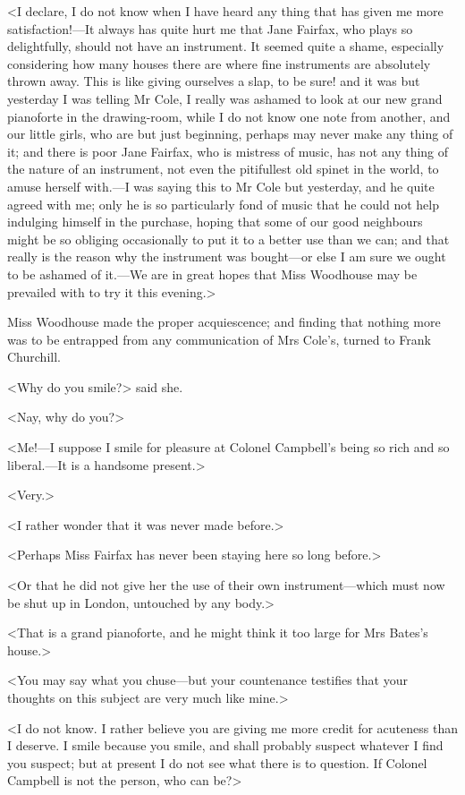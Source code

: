 <I declare, I do not know when I have heard any thing that has given me more satisfaction!—It always has quite hurt me that Jane Fairfax, who plays so delightfully, should not have an instrument. It seemed quite a shame, especially considering how many houses there are where fine instruments are absolutely thrown away. This is like giving ourselves a slap, to be sure! and it was but yesterday I was telling Mr Cole, I really was ashamed to look at our new grand pianoforte in the drawing-room, while I do not know one note from another, and our little girls, who are but just beginning, perhaps may never make any thing of it; and there is poor Jane Fairfax, who is mistress of music, has not any thing of the nature of an instrument, not even the pitifullest old spinet in the world, to amuse herself with.—I was saying this to Mr Cole but yesterday, and he quite agreed with me; only he is so particularly fond of music that he could not help indulging himself in the purchase, hoping that some of our good neighbours might be so obliging occasionally to put it to a better use than we can; and that really is the reason why the instrument was bought—or else I am sure we ought to be ashamed of it.—We are in great hopes that Miss Woodhouse may be prevailed with to try it this evening.>

Miss Woodhouse made the proper acquiescence; and finding that nothing more was to be entrapped from any communication of Mrs Cole's, turned to Frank Churchill.

<Why do you smile?> said she.

<Nay, why do you?>

<Me!—I suppose I smile for pleasure at Colonel Campbell's being so rich and so liberal.—It is a handsome present.>

<Very.>

<I rather wonder that it was never made before.>

<Perhaps Miss Fairfax has never been staying here so long before.>

<Or that he did not give her the use of their own instrument—which must now be shut up in London, untouched by any body.>

<That is a grand pianoforte, and he might think it too large for Mrs Bates's house.>

<You may say what you chuse—but your countenance testifies that your thoughts on this subject are very much like mine.>

<I do not know. I rather believe you are giving me more credit for acuteness than I deserve. I smile because you smile, and shall probably suspect whatever I find you suspect; but at present I do not see what there is to question. If Colonel Campbell is not the person, who can be?>

